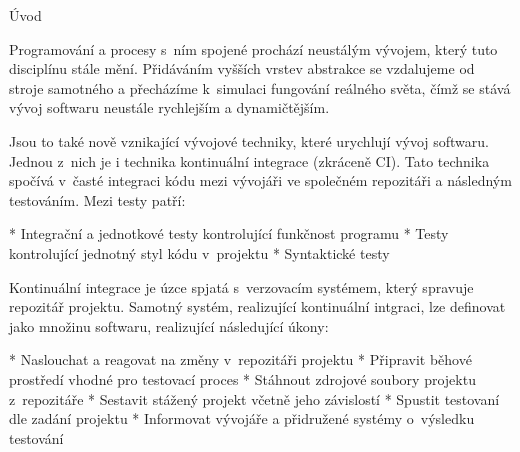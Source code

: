 \chap Úvod

Programování a procesy s~ním spojené prochází neustálým vývojem, který tuto disciplínu stále mění. 
Přidáváním vyšších vrstev abstrakce se vzdalujeme od stroje samotného a přecházíme k~simulaci fungování reálného světa, čímž se stává vývoj softwaru neustále rychlejším a dynamičtějším. 


Jsou to také nově vznikající vývojové techniky, které urychlují vývoj softwaru.
Jednou z~nich je i technika kontinuální integrace (zkráceně CI). Tato technika spočívá v~časté integraci kódu mezi vývojáři ve společném repozitáři a následným testováním. Mezi testy patří:

\begitems
* Integrační a jednotkové testy kontrolující funkčnost programu
* Testy kontrolující jednotný styl kódu v~projektu
* Syntaktické testy
\enditems

Kontinuální integrace je úzce spjatá s~verzovacím systémem, který spravuje repozitář projektu. Samotný systém, realizující kontinuální intgraci, lze definovat jako množinu softwaru, realizující následující úkony:

\begitems
* Naslouchat a reagovat na změny v~repozitáři projektu
* Připravit běhové prostředí vhodné pro testovací proces
* Stáhnout zdrojové soubory projektu z~repozitáře
* Sestavit stážený projekt včetně jeho závislostí
* Spustit testovaní dle zadání projektu
* Informovat vývojáře a přidružené systémy o~výsledku testování
\enditems


